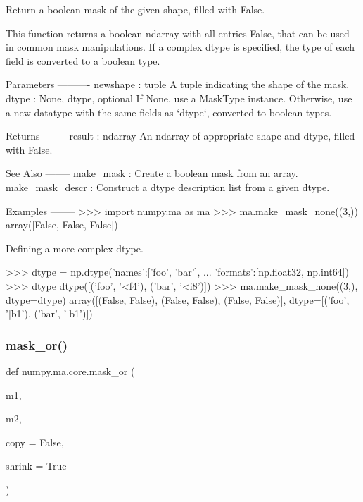 \begin{DoxyVerb}Return a boolean mask of the given shape, filled with False.

This function returns a boolean ndarray with all entries False, that can
be used in common mask manipulations. If a complex dtype is specified, the
type of each field is converted to a boolean type.

Parameters
----------
newshape : tuple
    A tuple indicating the shape of the mask.
dtype : {None, dtype}, optional
    If None, use a MaskType instance. Otherwise, use a new datatype with
    the same fields as `dtype`, converted to boolean types.

Returns
-------
result : ndarray
    An ndarray of appropriate shape and dtype, filled with False.

See Also
--------
make_mask : Create a boolean mask from an array.
make_mask_descr : Construct a dtype description list from a given dtype.

Examples
--------
>>> import numpy.ma as ma
>>> ma.make_mask_none((3,))
array([False, False, False])

Defining a more complex dtype.

>>> dtype = np.dtype({'names':['foo', 'bar'],
...                   'formats':[np.float32, np.int64]})
>>> dtype
dtype([('foo', '<f4'), ('bar', '<i8')])
>>> ma.make_mask_none((3,), dtype=dtype)
array([(False, False), (False, False), (False, False)],
      dtype=[('foo', '|b1'), ('bar', '|b1')])\end{DoxyVerb}
 \mbox{\label{namespacenumpy_1_1ma_1_1core_aeba455fcb81bfb5d206db0606926b867}} 
\subsubsection{\texorpdfstring{mask\+\_\+or()}{mask\_or()}}
{\footnotesize\ttfamily def numpy.\+ma.\+core.\+mask\+\_\+or (\begin{DoxyParamCaption}\item[{}]{m1,  }\item[{}]{m2,  }\item[{}]{copy = {\ttfamily False},  }\item[{}]{shrink = {\ttfamily True} }\end{DoxyParamCaption})}

